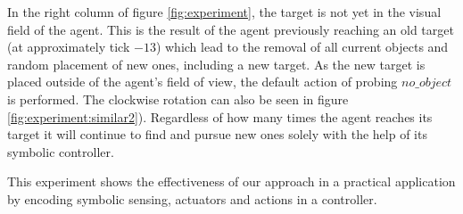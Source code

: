 \documentclass[journal]{journal}
\begin{document}
In the right column of figure \ref{fig:experiment}, the target is not yet
in the visual field of the agent.
This is the result of the agent previously reaching an old target (at approximately tick $-13$) which lead
to the removal of all current objects and random placement of new ones,
including a new target.
As the new target is placed outside of the agent's field of view, the default
action of probing $no\_object$ is performed. The
clockwise rotation can also be seen in figure \ref{fig:experiment:similar2}). Regardless of how many times the agent reaches its target it will continue to find and pursue new ones solely with the help of its symbolic controller.

This experiment shows the effectiveness of our approach in a practical
application by encoding symbolic sensing, actuators and actions in a
controller.
\end{document}
